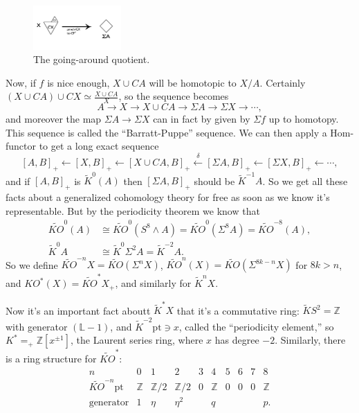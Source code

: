\documentclass{article}
\newcommand{\Z}{\mathbb{Z}}
\newcommand{\bundle}[1]{\mathbb{#1}}
\newcommand{\sprod}{\wedge}
\newcommand{\pt}[1]{#1_+}
\newcommand{\ptspace}{\mathrm{pt}}
\newcommand{\Suspend}{\Sigma}
\newcommand{\from}{\leftarrow}
\begin{document}
\begin{figure}
\centering\includegraphics[width=0.3\textwidth]{figures/13.pdf}
\caption{\small The going-around quotient.}
\end{figure}
Now, if $f$ is nice enough, $X \cup CA$ will be homotopic to $X / A$.  Certainly $(X \cup CA) \cup CX \simeq \frac{X \cup CA}{X}$, so the sequence becomes
\[
A \to X \to X \cup CA \to \Suspend A \to \Suspend X \to \cdots
,\]
and moreover the map $\Suspend A \to \Suspend X$ can in fact by given by $\Sigma f$ up to homotopy.  This sequence is called the ``Barratt-Puppe'' sequence.  We can then apply a Hom-functor to get a long exact sequence
\[
[A, B]_+ \from [X, B]_+ \from [X \cup CA, B]_+ \stackrel{\delta}{\from} [\Suspend A, B]_+ \from [\Suspend X, B]_+ \from \cdots
,\]
and if $[A, B]_+$ is $\tilde K^0(A)$ then $[\Suspend A, B]_+$ should be $\tilde K^{-1} A$.  So we get all these facts about a generalized cohomology theory for free as soon as we know it's representable.  But by the periodicity theorem we know that 
\begin{align*}
\widetilde{KO}^0(A)& \cong \widetilde{KO}^0(S^8 \sprod A) = \widetilde{KO}^0(\Suspend^8 A) = \widetilde{KO}^{-8}(A), \\
\tilde K^0 A & \cong \tilde K^0 \Suspend^2 A = \tilde K^{-2} A.
\end{align*}
So we define $\widetilde{KO}^{-n} X = \widetilde{KO}(\Suspend^n X)$, $\widetilde{KO}^n(X) = \widetilde{KO}(\Suspend^{8k-n}X)$ for $8k > n$, and $KO^*(X) = \widetilde{KO}^* X_+$, and similarly for $\tilde K^n X$.

Now it's an important fact aboutt $\tilde K^* X$ that it's a commutative ring: $\tilde K S^2 = \Z$ with generator $(\bundle{L} - 1)$, and $\tilde K^{-2} \ptspace \ni x$, called the ``periodicity element,'' so $K^* \pt = \Z[x^{\pm 1}]$, the Laurent series ring, where $x$ has degree $-2$.  Similarly, there is a ring structure for $\widetilde{KO}^*$:
\[
\begin{array}{c|ccccccccc}
n & 0 & 1 & 2 & 3 & 4 & 5 & 6 & 7 & 8 \\
\hline
\widetilde{KO}^{-n} \ptspace & \Z & \Z/2 & \Z/2 & 0 & \Z & 0 & 0 & 0 & \Z \\
\mathrm{generator} & 1 & \eta & \eta^2 & & q & & & & p.
\end{array}
\]
\end{document}
